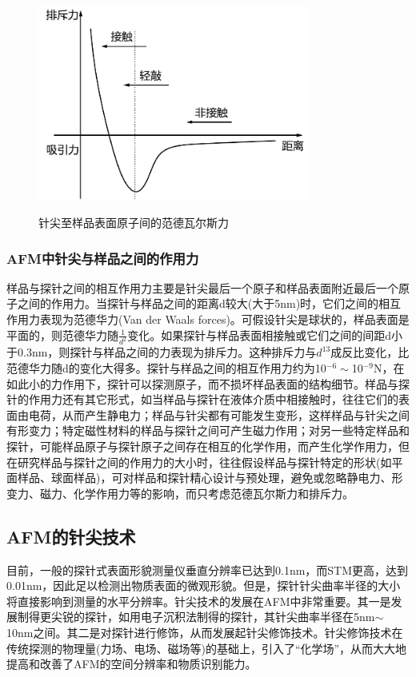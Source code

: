 \documentclass[a4paper]{article}
\begin{document}
\begin{figure}[!h]
\centering
\includegraphics[width=0.8\textwidth]{fig/fig5.pdf}\\
\caption{针尖至样品表面原子间的范德瓦尔斯力}\label{fig5}
\end{figure}
\subsubsection{AFM中针尖与样品之间的作用力}
样品与探针之间的相互作用力主要是针尖最后一个原子和样品表面附近最后一个原子之间的作用力。当探针与样品之间的距离d较大(大于5nm)时，它们之间的相互作用力表现为范德华力(Van der Waals forces)。可假设针尖是球状的，样品表面是平面的，则范德华力随$\frac{1}{d^2}$变化。如果探针与样品表面相接触或它们之间的间距d小于0.3nm，则探针与样品之间的力表现为排斥力。这种排斥力与$d^{13}$成反比变化，比范德华力随d的变化大得多。探针与样品之间的相互作用力约为10$^{-6}\sim$10$^{-9}$N，在如此小的力作用下，探针可以探测原子，而不损坏样品表面的结构细节。样品与探针的作用力还有其它形式，如当样品与探针在液体介质中相接触时，往往它们的表面由电荷，从而产生静电力；样品与针尖都有可能发生变形，这样样品与针尖之间有形变力；特定磁性材料的样品与探针之间可产生磁力作用；对另一些特定样品和探针，可能样品原子与探针原子之间存在相互的化学作用，而产生化学作用力，但在研究样品与探针之间的作用力的大小时，往往假设样品与探针特定的形状(如平面样品、球面样品)，可对样品和探针精心设计与预处理，避免或忽略静电力、形变力、磁力、化学作用力等的影响，而只考虑范德瓦尔斯力和排斥力。
\subsection{AFM的针尖技术}
目前，一般的探针式表面形貌测量仪垂直分辨率已达到0.1nm，而STM更高，达到0.01nm，因此足以检测出物质表面的微观形貌。但是，探针针尖曲率半径的大小将直接影响到测量的水平分辨率。针尖技术的发展在AFM中非常重要。其一是发展制得更尖锐的探针，如用电子沉积法制得的探针，其针尖曲率半径在5nm$\sim$10nm之间。其二是对探针进行修饰，从而发展起针尖修饰技术。针尖修饰技术在传统探测的物理量(力场、电场、磁场等)的基础上，引入了“化学场”，从而大大地提高和改善了AFM的空间分辨率和物质识别能力。
\end{document}
